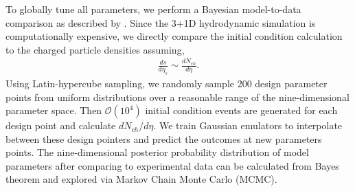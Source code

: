 \documentclass[3p,times,twocolumn]{elsarticle}
\begin{document}
To globally tune all parameters, we perform a Bayesian model-to-data comparison as described by \cite{Bernhard:2015hxa}.
Since the 3+1D hydrodynamic simulation is computationally expensive, we directly compare the initial condition calculation  to the charged particle densities assuming,
\begin{eqnarray}
\frac{ds}{d\eta_s} \sim \frac{dN_{ch}}{d\eta}.
\end{eqnarray}
Using Latin-hypercube sampling, we randomly sample 200 design parameter points from uniform distributions  over a reasonable range of the nine-dimensional parameter space. Then $\mathcal{O}(10^4)$ initial condition events are generated for each design point and calculate $dN_{ch}/d\eta$.
We train Gaussian emulators to interpolate between these design pointers and predict the outcomes at new parameters points.
The nine-dimensional posterior probability distribution of model parameters after comparing to experimental data can be calculated from Bayes theorem and explored via Markov Chain Monte Carlo (MCMC).
\end{document}
